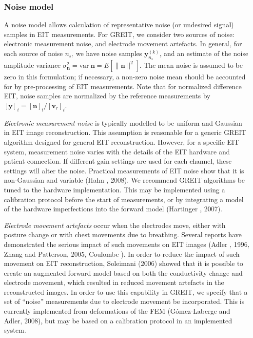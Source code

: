 \documentclass[12pt]{iopart}
\newcommand{\vB}{\mbox{$\mathbf{v}$}}
\newcommand{\nB}{\mbox{$\mathbf{n}$}}
\newcommand{\yB}{\mbox{$\mathbf{y}$}}
\begin{document}
\subsubsection{Noise model}

A noise model allows calculation of representative 
noise (or undesired signal) samples in EIT measurements.
For GREIT, we consider two sources of noise:
electronic measurement noise, and
electrode movement artefacts. In general, for each
source of noise $n_s$, we have noise samples $\yB^{(k)}_{n_s}$,
and an estimate of the noise amplitude variance
 $\sigma_{\nB}^2 = \mathrm{var}~\nB = E[ \| \nB \|^2 ]$. 
The mean noise is assumed to be zero in this formulation;
if necessary, a non-zero noise mean should be accounted for
by pre-processing of EIT measurements.
Note that for normalized difference EIT,
noise samples are normalized by the
reference measurements by $[\yB]_i = [\nB ]_i / [\vB_r]_i$.

{\em Electronic measurement noise}
is typically modelled to be uniform and Gaussian in EIT
image reconstruction. This assumption is reasonable for
a generic GREIT algorithm designed for general EIT reconstruction.
However, for a specific EIT system, measurement noise
varies with the details of the EIT hardware and patient
connection. If different gain settings are used for each
channel, these settings will alter the noise. Practical
measurements of EIT noise show that it is non-Gaussian and
variable (Hahn \etal, 2008). We recommend GREIT algorithms
be tuned to the hardware implementation. This may be 
implemented using a calibration protocol before the 
start of measurements, or by integrating a model of 
the hardware imperfections into the forward model
(Hartinger \etal, 2007).

{\em Electrode movement artefacts}
occur when the electrodes move, either with posture change
or with chest movements due to breathing. Several reports
have demonstrated the serious impact of such movements on
EIT images (Adler \etal, 1996, Zhang and Patterson, 2005,
Coulombe ). In order to reduce the impact
of such movement on EIT reconstruction, Soleimani \etal
(2006) showed that it is possible to create an
augmented forward model based on both the conductivity change
and electrode movement, which resulted in reduced movement 
artefacts in the reconstructed images. In order
to use this capability in GREIT, we specify that a
set of ``noise'' measurements due to electrode movement 
be incorporated. This is currently implemented from
deformations of the FEM (G\'omez-Laberge and Adler, 2008),
but may be based on a calibration protocol in an
implemented system.
\end{document}
